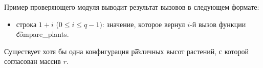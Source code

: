 Пример проверяющего модуля выводит результат вызовов в следующем формате:
\begin{itemize}
\item строка $1 + i$ ($0 \leq i \leq q - 1)$: значение, которое вернул $i$-й вызов функции \t{compare\_plants}.
\end{itemize}

Существует хотя бы одна конфигурация \t{различных высот} растений, с которой согласован массив $r$.